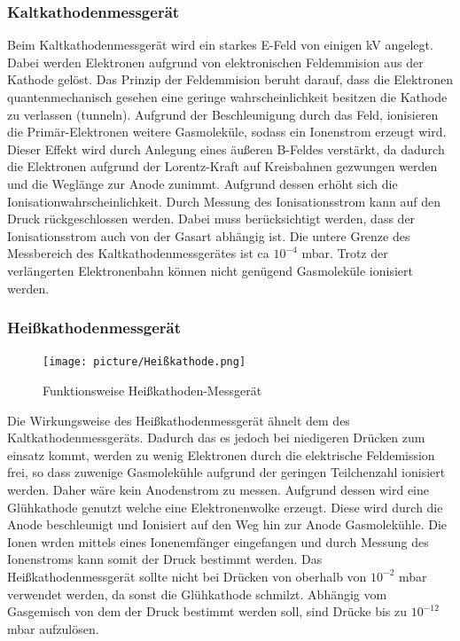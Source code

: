\subsubsection{Kaltkathodenmessgerät}
Beim Kaltkathodenmessgerät wird ein starkes E-Feld von einigen kV angelegt. Dabei werden Elektronen aufgrund von elektronischen Feldemmision aus der Kathode gelöst. Das Prinzip der Feldemmision beruht darauf, dass die Elektronen quantenmechanisch gesehen eine geringe wahrscheinlichkeit besitzen die Kathode zu verlassen (tunneln). Aufgrund der Beschleunigung durch das Feld, ionisieren die Primär-Elektronen weitere Gasmoleküle, sodass ein Ionenstrom erzeugt wird. Dieser Effekt wird durch Anlegung eines äußeren B-Feldes verstärkt, da dadurch die Elektronen aufgrund der Lorentz-Kraft auf Kreisbahnen gezwungen werden und die Weglänge zur Anode zunimmt. Aufgrund dessen erhöht sich die Ionisationwahrscheinlichkeit. Durch Messung des Ionisationsstrom kann auf den Druck rückgeschlossen werden. Dabei muss berücksichtigt werden, dass der Ionisationsstrom auch von der Gasart abhängig ist. Die untere Grenze des Messbereich des Kaltkathodenmessgerätes ist ca $10^{-4}$ mbar. Trotz der verlängerten Elektronenbahn können nicht genügend Gasmoleküle ionisiert werden.

\subsubsection{Heißkathodenmessgerät}
\begin{figure}
  \vspace{-1.0cm}
  \centering
  \texttt{[image: picture/Heißkathode.png]}
  \caption{Funktionsweise Heißkathoden-Messgerät \cite{Heiss}}
  \label{fig:Heißkathode}
  \vspace{-1cm}
\end{figure}
Die Wirkungsweise des Heißkathodenmessgerät ähnelt dem des Kaltkathodenmessgeräts. Dadurch das es jedoch bei niedigeren Drücken zum einsatz kommt, werden zu wenig Elektronen durch die elektrische Feldemission frei, so dass zuwenige Gasmolekühle aufgrund der geringen Teilchenzahl ionisiert werden. Daher wäre kein Anodenstrom zu messen. Aufgrund dessen wird eine Glühkathode genutzt welche eine Elektronenwolke erzeugt. Diese wird durch die Anode beschleunigt und Ionisiert auf den Weg hin zur Anode Gasmolekühle. Die Ionen wrden mittels eines Ionenemfänger eingefangen und durch Messung des Ionenstroms kann somit der Druck bestimmt werden. Das Heißkathodenmessgerät sollte nicht bei Drücken von oberhalb von $10^{-2}$ mbar verwendet werden, da sonst die Glühkathode schmilzt. Abhängig vom Gasgemisch von dem der Druck bestimmt werden soll, sind Drücke bis zu $10^{-12}$ mbar aufzulösen.
